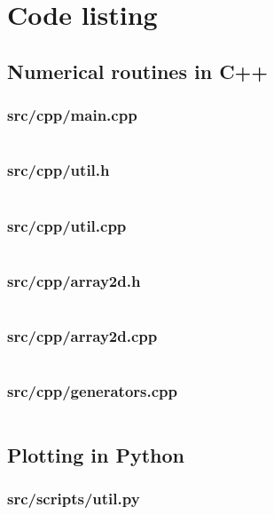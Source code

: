 \documentclass{article}
\begin{document}
\section{Code listing}
\subsection{Numerical routines in C++}

\subsubsection{src/cpp/main.cpp}
\inputminted[fontsize=\footnotesize]{C++}{../src/cpp/main.cpp}

\subsubsection{src/cpp/util.h}
\inputminted[fontsize=\footnotesize]{C++}{../src/cpp/util.h}

\subsubsection{src/cpp/util.cpp}
\inputminted[fontsize=\footnotesize]{C++}{../src/cpp/util.cpp}

\subsubsection{src/cpp/array2d.h}
\inputminted[fontsize=\footnotesize]{C++}{../src/cpp/array2d.h}

\subsubsection{src/cpp/array2d.cpp}
\inputminted[fontsize=\footnotesize]{C++}{../src/cpp/array2d.cpp}

\subsubsection{src/cpp/generators.cpp}
\inputminted[fontsize=\footnotesize]{C++}{../src/cpp/generators.cpp}

\subsection{Plotting in Python}

\subsubsection{src/scripts/util.py}
\inputminted[fontsize=\footnotesize]{Python}{../src/scripts/util.py}
\end{document}
